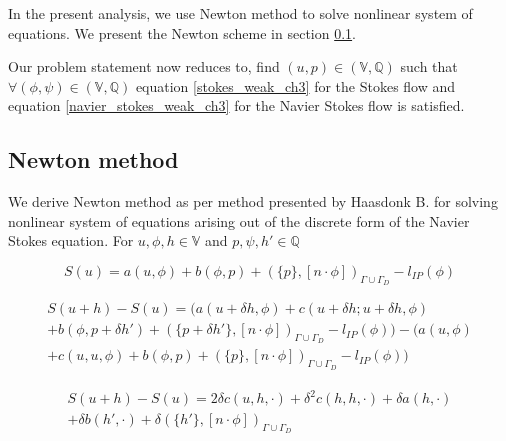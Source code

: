 \documentclass[a4paper,openany]{book}
\begin{document}
In the present analysis, we use Newton method to solve nonlinear system of equations. We present the Newton scheme in section \ref{newton_method}. 

Our problem statement now reduces to, find $(u,p) \in (\mathbb{V},\mathbb{Q})$ such that $\forall (\phi,\psi) \in (\mathbb{V},\mathbb{Q})$ equation \ref{stokes_weak_ch3} for the Stokes flow and equation \ref{navier_stokes_weak_ch3} for the Navier Stokes flow is satisfied.

\subsection{Newton method} \label{newton_method}

We derive Newton method as per method presented by Haasdonk B. \cite{Haasdonk} for solving nonlinear system of equations arising out of the discrete form of the Navier Stokes equation. For $u, \phi , h \in \mathbb{V}$ and $p, \psi , h' \in \mathbb{Q}$ \\
\begin{flushleft}
\begin{equation}
S(u) = a(u,\phi) + b(\phi,p) + (\{p\},[n\cdot \phi])_{\Gamma \cup \Gamma_D} - l_{IP}(\phi)
\end{equation}
\end{flushleft}

\begin{flushleft}
\begin{equation}
\begin{split}
S(u+h) - S(u) = (a(u+\delta h,\phi) + c(u + \delta h;u + \delta h,\phi)\\ + b(\phi,p+\delta h') + (\{p+\delta h'\},[n\cdot \phi])_{\Gamma \cup \Gamma_D} - l_{IP}(\phi)) - (a(u,\phi)\\ + c(u,u,\phi) + b(\phi,p) + (\{p\},[n\cdot \phi])_{\Gamma \cup \Gamma_D} - l_{IP}(\phi))
\end{split}
\end{equation}
\end{flushleft}

\begin{flushleft}
\begin{equation}
\begin{split}
S(u+h) - S(u) = 2\delta c(u,h,\cdot) + \delta^2 c(h,h,\cdot) + \delta a(h,\cdot)\\ + \delta b(h',\cdot) + \delta (\{h'\},[n\cdot \phi])_{\Gamma \cup \Gamma_D}
\end{split}
\end{equation}
\end{flushleft}
\end{document}
